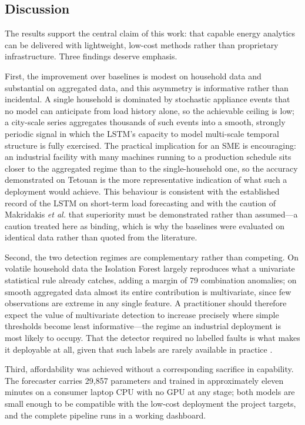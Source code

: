 \documentclass[conference]{IEEEtran}
\begin{document}
\subsection{Discussion}
The results support the central claim of this work: that capable energy
analytics can be delivered with lightweight, low-cost methods rather than
proprietary infrastructure. Three findings deserve emphasis.

First, the improvement over baselines is modest on household data and
substantial on aggregated data, and this asymmetry is informative rather than
incidental. A single household is dominated by stochastic appliance events that
no model can anticipate from load history alone, so the achievable ceiling is
low; a city-scale series aggregates thousands of such events into a smooth,
strongly periodic signal in which the LSTM's capacity to model multi-scale
temporal structure is fully exercised. The practical implication for an SME is
encouraging: an industrial facility with many machines running to a production
schedule sits closer to the aggregated regime than to the single-household one,
so the accuracy demonstrated on Tetouan is the more representative indication
of what such a deployment would achieve. This behaviour is consistent with the
established record of the LSTM on short-term load forecasting
\cite{kong2017short} and with the caution of Makridakis \textit{et al.}
\cite{makridakis2018statistical} that superiority must be demonstrated rather
than assumed---a caution treated here as binding, which is why the baselines
were evaluated on identical data rather than quoted from the literature.

Second, the two detection regimes are complementary rather than competing. On
volatile household data the Isolation Forest largely reproduces what a
univariate statistical rule already catches, adding a margin of 79 combination
anomalies; on smooth aggregated data almost its entire contribution is
multivariate, since few observations are extreme in any single feature. A
practitioner should therefore expect the value of multivariate detection to
increase precisely where simple thresholds become least informative---the
regime an industrial deployment is most likely to occupy. That the detector
required no labelled faults is what makes it deployable at all, given that such
labels are rarely available in practice \cite{himeur2021artificial}.

Third, affordability was achieved without a corresponding sacrifice in
capability. The forecaster carries 29{,}857 parameters and trained in
approximately eleven minutes on a consumer laptop CPU with no GPU at any stage;
both models are small enough to be compatible with the low-cost deployment the
project targets, and the complete pipeline runs in a working dashboard.
\end{document}
